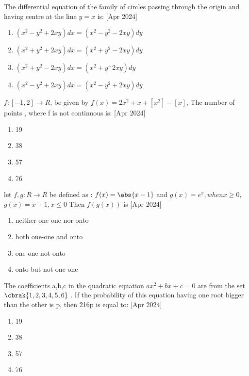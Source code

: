     

    \item The differential equation of the family of circles passing through the origin and having centre at the line $y=x$ is:
     \hfill{[Apr 2024]}
    \begin{multicols}{2}
            \begin{enumerate}
             \item $(x^2-y^2+2xy)dx=(x^2-y^2-2xy)dy$
              \item $(x^2+y^2+2xy)dx=(x^2+y^2-2xy)dy$
               \item $(x^2+y^2-2xy)dx=(x^2+y^+2xy)dy$
                \item $(x^2-y^2+2xy)dx=(x^2-y^2+2xy)dy$
            \end{enumerate}
        \end{multicols}
    \item $f:[-1,2]\rightarrow R$, be given by $f(x)=2x^2+x+[x^2]-[x]$, The number of points , where f is  not continuous is:
      \hfill{[Apr 2024]}
    \begin{multicols}{4}
            \begin{enumerate}
        
              \item 19
              \item 38
              \item 57
              \item 76
            \end{enumerate}
        \end{multicols}
    
    \item let $f,g: R\rightarrow R $ be defined as : $f(x)=\abs{x-1}$ and $g(x)=e^x, when x\geq 0$,$g(x)=x+1, x\leq 0$ Then $f(g(x))$ is
     \hfill{[Apr 2024]}
    \begin{multicols}{2}
            \begin{enumerate}
              \item neither one-one nor onto
              \item both one-one and onto
              \item one-one not onto
              \item onto but not one-one
            \end{enumerate}
        \end{multicols}
        \item The coefficients a,b,c in the quadratic equation $ax^2+bx+c=0$ are from the set $\cbrak{1,2,3,4,5,6}$ . If the probability of this equation having one root bigger than the other is p, then 216p is equal to:
         \hfill{[Apr 2024]}
        \begin{multicols}{4}
            \begin{enumerate}
              \item 19
              \item  38
              \item 57
              \item 76
            \end{enumerate}
        \end{multicols}

